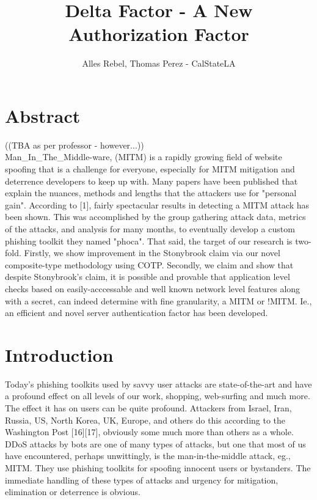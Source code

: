 \documentclass[a4paper, 11pt]{article} 				%
\title{Delta Factor - A New Authorization Factor}
\author{Alles Rebel, Thomas Perez - CalStateLA}
\begin{document}
\maketitle



\section{Abstract}
\setlength{\baselineskip}{1.5\baselineskip}
((TBA as per professor - however...))\\ %
\noindent
Man\_In\_The\_Middle-ware, (MITM) is a rapidly growing field of website spoofing that is a challenge for everyone, especially for MITM mitigation and deterrence  developers to keep up with. Many papers have been published that explain the nuances, methods and lengths that the attackers use for "personal gain". According to [1], fairly spectacular results in detecting a MITM attack has been shown. This was accomplished by the group gathering attack data, metrics of the attacks, and analysis for many months, to eventually develop a custom phishing toolkit they named "phoca". That said, the target of our research is two-fold. Firstly, we show improvement in the Stonybrook claim via our novel composite-type methodology using COTP.  Secondly, we claim and show that despite Stonybrook's claim, it is possible and provable that application level checks based on easily-acccessable and well known network level features along with a secret, can indeed determine with fine granularity, a MITM or !MITM. Ie., an efficient and novel server authentication factor has been developed.  



\section{Introduction}
\noindent
Today’s phishing toolkits used by savvy user attacks are state-of-the-art and have a profound effect on all levels of our work, shopping, web-surfing and much more. The effect it has on users can be quite profound. Attackers from Israel, Iran, Russia, US, North Korea, UK, Europe, and others do this according to the Washington Post [16][17], obviously some much more than others as a whole. DDoS attacks by bots are one of many types of attacks, but one that most of us have encountered, perhaps unwittingly, is the  man-in-the-middle attack, eg., MITM. They use phishing toolkits for spoofing innocent users or bystanders. The immediate handling of these types of attacks and urgency for mitigation, elimination or deterrence is obvious. 
\end{document}
